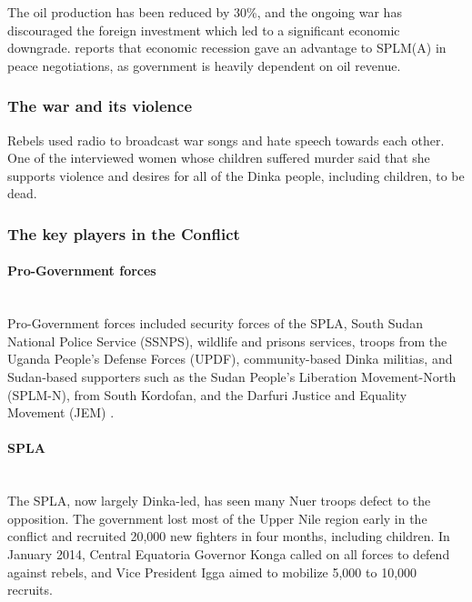 \documentclass[14pt,a4paper]{article}
\begin{document}
The oil production has been reduced by 30\%, and the ongoing war has discouraged the foreign investment which led to a significant economic downgrade. \cite{rolandsen2015year} reports that economic recession gave an advantage to SPLM(A) in peace negotiations, as government is heavily dependent on oil revenue. 

\subsubsection{The war and its violence}
Rebels used radio to broadcast war songs and hate speech towards each other. One of the interviewed women whose children suffered murder said that she supports violence and desires for all of the Dinka people, including children, to be dead. 

\subsubsection{The key players in the Conflict}
\paragraph{Pro-Government forces} \mbox{}\\
Pro-Government forces included security forces of the SPLA, South Sudan National Police Service (SSNPS), wildlife and prisons services, troops from
the Uganda People’s Defense Forces (UPDF), community-based Dinka militias, and Sudan-based
supporters such as the Sudan People’s Liberation Movement-North (SPLM-N), from South Kordofan, and
the Darfuri Justice and Equality Movement (JEM) \cite{observer2014military}. 



\paragraph{SPLA} \mbox{}\\
The SPLA, now largely Dinka-led, has seen many Nuer troops defect to the opposition. The government lost most of the Upper Nile region early in the conflict and recruited 20,000 new fighters in four months, including children. In January 2014, Central Equatoria Governor Konga called on all forces to defend against rebels, and Vice President Igga aimed to mobilize 5,000 to 10,000 recruits. 
\end{document}
